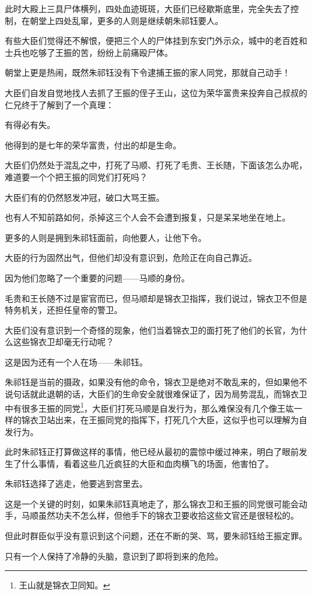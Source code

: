 \begin{multicols}{\theparacolNo}
此时大殿上三具尸体横列，四处血迹斑斑，大臣们已经歇斯底里，完全失去了控制，在朝堂上四处乱窜，更多的人则是继续朝朱祁钰要人。

有些大臣们觉得还不解恨，便把三个人的尸体挂到东安门外示众，城中的老百姓和士兵也吃够了王振的苦，纷纷上前痛殴尸体。

朝堂上更是热闹，既然朱祁钰没有下令逮捕王振的家人同党，那就自己动手！

大臣们自发自觉地找人去抓了王振的侄子王山，这位为荣华富贵来投奔自己叔叔的仁兄终于了解到了一个真理：

有得必有失。

他得到的是七年的荣华富贵，付出的却是生命。

大臣们仍然处于混乱之中，打死了马顺、打死了毛贵、王长随，下面该怎么办呢，难道要一个个把王振的同党们打死吗？

大臣们有的仍然怒发冲冠，破口大骂王振。

也有人不知前路如何，杀掉这三个人会不会遭到报复，只是呆呆地坐在地上。

更多的人则是拥到朱祁钰面前，向他要人，让他下令。

大臣的行为固然出气，但他们却没有意识到，危险正在向自己靠近。

因为他们忽略了一个重要的问题——马顺的身份。

毛贵和王长随不过是宦官而已，但马顺却是锦衣卫指挥，我们说过，锦衣卫不但是特务机关，还担任皇帝的警卫。

大臣们没有意识到一个奇怪的现象，他们当着锦衣卫的面打死了他们的长官，为什么这些锦衣卫却毫无行动呢？

这是因为还有一个人在场——朱祁钰。

朱祁钰是当前的摄政，如果没有他的命令，锦衣卫是绝对不敢乱来的，但如果他不说句话就此退朝的话，大臣们的生命安全就很难保证了，因为局势混乱，而锦衣卫中有很多王振的同党\footnote{王山就是锦衣卫同知。}，大臣们打死马顺是自发行为，那么难保没有几个像王竑一样的锦衣卫站出来，在王振同党的指挥下，打死几个大臣，这似乎也可以理解为自发行为。

此时朱祁钰正打算做这样的事情，他已经从最初的震惊中缓过神来，明白了眼前发生了什么事情，看着这些几近疯狂的大臣和血肉横飞的场面，他害怕了。

朱祁钰选择了逃走，他要逃到宫里去。

这是一个关键的时刻，如果朱祁钰真地走了，那么锦衣卫和王振的同党很可能会动手，马顺虽然功夫不怎么样，但他手下的锦衣卫要收拾这些文官还是很轻松的。

但此时群臣似乎没有意识到这个问题，还在不断的哭、骂，要朱祁钰给王振定罪。

只有一个人保持了冷静的头脑，意识到了即将到来的危险。


\end{multicols}

